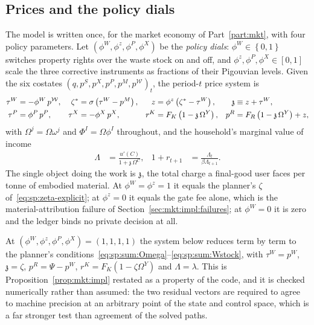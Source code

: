 \subsection{Prices and the policy dials}\label{sec:q:model:policy}

The model is written once, for the market economy of Part~\ref{part:mkt}, with four policy parameters. Let $\left(\phi^W,\phi^z,\phi^P,\phi^X\right)$ be the \emph{policy dials}: $\phi^W\in\left\{0,1\right\}$ switches property rights over the waste stock on and off, and $\phi^z,\phi^P,\phi^X\in\left[0,1\right]$ scale the three corrective instruments as fractions of their Pigouvian levels. Given the six costates $\left(q,p^S,p^X,p^P,p^M,p^{\mathcal W}\right)_t$, the period-$t$ price system is
\begin{align}
\tau^W &= -\phi^W\,p^{\mathcal W},
&
\zeta^{\ast} &= \sigma\left(\tau^W-p^M\right),
&
z &= \phi^z\left(\zeta^{\ast}-\tau^W\right),
&
\mathfrak z &\equiv z+\tau^W,
\notag\\
\tau^P &= \phi^P\,p^P,
&
\tau^X &= -\phi^X\,p^X,
&
r^K &= F_K\left(1-\mathfrak z\,\Omega^Y\right),
&
p^R &= F_R\left(1-\mathfrak z\,\Omega^Y\right)+z,
\label{eq:q:prices}
\end{align}
with $\Omega^j=\Omega\omega^j$ and $\Phi^I=\Omega\phi^I$ throughout, and the household's marginal value of income
\begin{align}
\Lambda &= \frac{u'\left(C\right)}{1+\mathfrak z\,\Omega^C},
&
1+r_{t+1} &= \frac{\Lambda_t}{\beta\Lambda_{t+1}} .
\label{eq:q:lambda}
\end{align}
The single object doing the work is $\mathfrak z$, the total charge a final-good user faces per tonne of embodied material. At $\phi^W=\phi^z=1$ it equals the planner's $\zeta$ of~\eqref{eq:sp:zeta-explicit}; at $\phi^z=0$ it equals the gate fee alone, which is the material-attribution failure of Section~\ref{sec:mkt:impl:failures}; at $\phi^W=0$ it is zero and the ledger binds no private decision at all.

\begin{remark}\label{rem:q:nesting}
At $\left(\phi^W,\phi^z,\phi^P,\phi^X\right)=\left(1,1,1,1\right)$ the system below reduces term by term to the planner's conditions~\eqref{eq:sp:sum:Omega}--\eqref{eq:sp:sum:Wstock}, with $\tau^W=p^W$, $\mathfrak z=\zeta$, $p^R=\Psi-p^W$, $r^K=F_K\left(1-\zeta\Omega^Y\right)$ and $\Lambda=\lambda$. This is Proposition~\ref{prop:mkt:impl} restated as a property of the code, and it is checked numerically rather than assumed: the two residual vectors are required to agree to machine precision at an arbitrary point of the state and control space, which is a far stronger test than agreement of the solved paths.
\end{remark}

